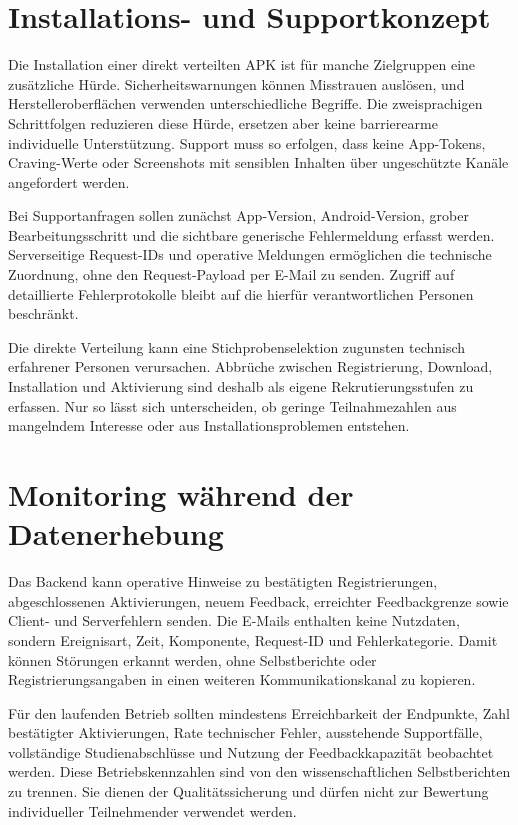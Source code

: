 \section{Installations- und Supportkonzept}
Die Installation einer direkt verteilten APK ist für manche Zielgruppen eine zusätzliche Hürde. Sicherheitswarnungen können Misstrauen auslösen, und Herstelleroberflächen verwenden unterschiedliche Begriffe. Die zweisprachigen Schrittfolgen reduzieren diese Hürde, ersetzen aber keine barrierearme individuelle Unterstützung. Support muss so erfolgen, dass keine App-Tokens, Craving-Werte oder Screenshots mit sensiblen Inhalten über ungeschützte Kanäle angefordert werden.

Bei Supportanfragen sollen zunächst App-Version, Android-Version, grober Bearbeitungsschritt und die sichtbare generische Fehlermeldung erfasst werden. Serverseitige Request-IDs und operative Meldungen ermöglichen die technische Zuordnung, ohne den Request-Payload per E-Mail zu senden. Zugriff auf detaillierte Fehlerprotokolle bleibt auf die hierfür verantwortlichen Personen beschränkt.

Die direkte Verteilung kann eine Stichprobenselektion zugunsten technisch erfahrener Personen verursachen. Abbrüche zwischen Registrierung, Download, Installation und Aktivierung sind deshalb als eigene Rekrutierungsstufen zu erfassen. Nur so lässt sich unterscheiden, ob geringe Teilnahmezahlen aus mangelndem Interesse oder aus Installationsproblemen entstehen.

\section{Monitoring während der Datenerhebung}
Das Backend kann operative Hinweise zu bestätigten Registrierungen, abgeschlossenen Aktivierungen, neuem Feedback, erreichter Feedbackgrenze sowie Client- und Serverfehlern senden. Die E-Mails enthalten keine Nutzdaten, sondern Ereignisart, Zeit, Komponente, Request-ID und Fehlerkategorie. Damit können Störungen erkannt werden, ohne Selbstberichte oder Registrierungsangaben in einen weiteren Kommunikationskanal zu kopieren.

Für den laufenden Betrieb sollten mindestens Erreichbarkeit der Endpunkte, Zahl bestätigter Aktivierungen, Rate technischer Fehler, ausstehende Supportfälle, vollständige Studienabschlüsse und Nutzung der Feedbackkapazität beobachtet werden. Diese Betriebskennzahlen sind von den wissenschaftlichen Selbstberichten zu trennen. Sie dienen der Qualitätssicherung und dürfen nicht zur Bewertung individueller Teilnehmender verwendet werden.

